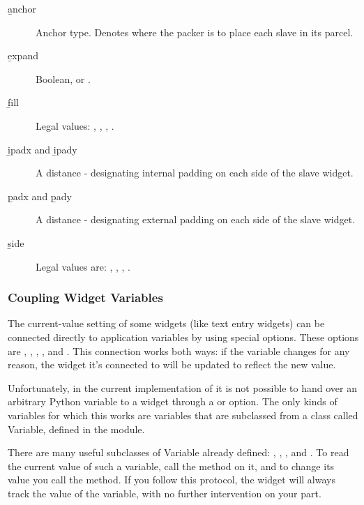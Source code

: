 \begin{description}
\item[\b{anchor }]
Anchor type.  Denotes where the packer is to place each slave in its
parcel.

\item[\b{expand}]
Boolean,  or .

\item[\b{fill}]
Legal values: , , , .

\item[\b{ipadx} and \b{ipady}]
A distance - designating internal padding on each side of the slave
widget.

\item[\b{padx} and \b{pady}]
A distance - designating external padding on each side of the slave
widget.

\item[\b{side}]
Legal values are: , , ,
.
\end{description}


\subsubsection{Coupling Widget Variables} %

The current-value setting of some widgets (like text entry widgets)
can be connected directly to application variables by using special
options.  These options are , ,
, , and .  This
connection works both ways: if the variable changes for any reason,
the widget it's connected to will be updated to reflect the new value. 

Unfortunately, in the current implementation of  it is
not possible to hand over an arbitrary Python variable to a widget
through a  or  option.  The only
kinds of variables for which this works are variables that are
subclassed from a class called Variable, defined in the
 module.

There are many useful subclasses of Variable already defined:
, , , and
.  To read the current value of such a variable,
call the  method on
it, and to change its value you call the  method.  If
you follow this protocol, the widget will always track the value of
the variable, with no further intervention on your part.

